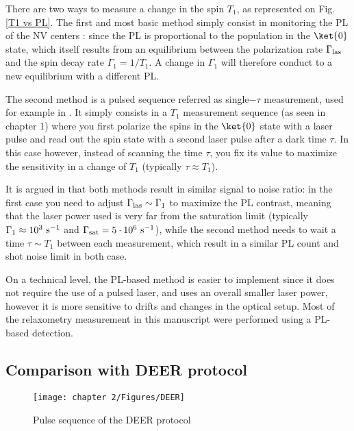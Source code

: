 \documentclass[a4paper,11pt]{report}
\begin{document}
\begin{refsection}
There are two ways to measure a change in the spin $T_1$, as represented on Fig. \ref{T1 vs PL}. The first and most basic method simply consist in monitoring the PL of the NV centers : since the PL is proportional to the population in the $\ket{0}$ state, which itself results from an equilibrium between the polarization rate $\Gamma_{\rm las}$ and the spin decay rate $\Gamma_1=1/T_1$. A change in $\Gamma_1$ will therefore conduct to a new equilibrium with a different PL. 

The second method is a pulsed sequence referred as single$-\tau$ measurement, used for example in \citep{pelliccione2014two, schmid2015relaxometry, tetienne2016scanning}. It simply consists in a $T_1$ measurement sequence (as seen in chapter 1) where you first polarize the spins in the $\ket{0}$ state with a laser pulse and read out the spin state with a second laser pulse after a dark time $\tau$. In this case however, instead of scanning the time $\tau$, you fix its value to maximize the sensitivity in a change of $T_1$ (typically $\tau \approx T_1$). 

It is argued in \citep{finco2021imaging} that both methods result in similar signal to noise ratio: in the first case you need to adjust $\Gamma_{\rm las} \sim \Gamma_1$ to maximize the PL contrast, meaning that the laser power used is very far from the saturation limit (typically $\Gamma_1 \approx 10^3\ \rm s^{-1}$ and $\Gamma_{\rm sat} = 5\cdot10^6\ \rm s^{-1}$\citep{dreau2011avoiding}), while the second method needs to wait a time $\tau \sim T_1$ between each measurement, which result in a similar PL count and shot noise limit in both case.

On a technical level, the PL-based method is easier to implement since it does not require the use of a pulsed laser, and uses an overall smaller laser power, however it is more sensitive to drifts and changes in the optical setup. Most of the relaxometry measurement in this manuscript were performed using a PL-based detection.

\subsection{Comparison with DEER protocol}

\begin{figure}[h]
\centering
\texttt{[image: chapter 2/Figures/DEER]}
\caption{Pulse sequence of the DEER protocol}
\label{DEER}
\end{figure}


\end{refsection}
\end{document}
